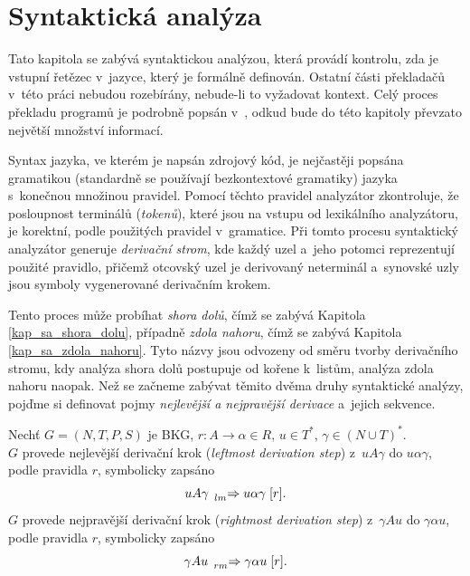\cleardoublepage

\chapter{Syntaktická analýza}\label{kap_teorie_sa}
Tato kapitola se zabývá syntaktickou analýzou, která provádí kontrolu, zda je vstupní řetězec v~jazyce, který je formálně definován.
Ostatní části překladačů v~této práci nebudou rozebírány, nebude-li to vyžadovat kontext.
Celý proces překladu programů je podrobně popsán v~\cite{medunaElementsOfCompDesign}, odkud bude do této kapitoly převzato největší množství informací.

Syntax jazyka, ve kterém je napsán zdrojový kód, je nejčastěji popsána gramatikou (standardně se používají bezkontextové gramatiky) jazyka s~konečnou množinou pravidel.
Pomocí těchto pravidel analyzátor zkontroluje, že posloupnost terminálů (\emph{tokenů}), které jsou na vstupu od lexikálního analyzátoru, je korektní, podle použitých pravidel v~gramatice.
Při tomto procesu syntaktický analyzátor generuje \emph{derivační strom}, kde každý uzel a~jeho potomci reprezentují použité pravidlo, přičemž otcovský uzel je derivovaný neterminál a~synovské uzly jsou symboly vygenerované derivačním krokem.

Tento proces může probíhat \emph{shora dolů}, čímž se zabývá Kapitola \ref{kap_sa_shora_dolu}, případně \emph{zdola nahoru}, čímž se zabývá Kapitola \ref{kap_sa_zdola_nahoru}.
Tyto názvy jsou odvozeny od směru tvorby derivačního stromu, kdy analýza shora dolů postupuje od kořene k~listům, analýza zdola nahoru naopak.
Než se začneme zabývat těmito dvěma druhy syntaktické analýzy, pojďme si definovat pojmy \emph{nejlevější a nejpravější derivace} a~jejich sekvence.
\begin{definition}\label{def_nejlevejsi_nejpravejsi_der}
     Nechť $G = (N, T, P, S)$ je BKG, $r: A \rightarrow \alpha \in R$, $u \in T^*$, $\gamma \in (N \cup T)^*$. \\ 
     $G$ provede nejlevější derivační krok (\emph{leftmost derivation step}) z~$uA\gamma$ do $u\alpha\gamma$, podle pravidla $r$, symbolicky zapsáno
    \begin{equation*}
        uA\gamma\; \prescript{}{\scriptstyle lm}{\Rightarrow}\; u\alpha\gamma \; [r].
    \end{equation*}
    $G$ provede nejpravější derivační krok (\emph{rightmost derivation step}) z~$\gamma Au$ do $\gamma \alpha u$, podle pravidla $r$, symbolicky zapsáno
    \begin{equation*}
        \gamma Au\; \prescript{}{\scriptstyle rm}{\Rightarrow}\; \gamma \alpha u\; [r].
    \end{equation*}
\end{definition}

